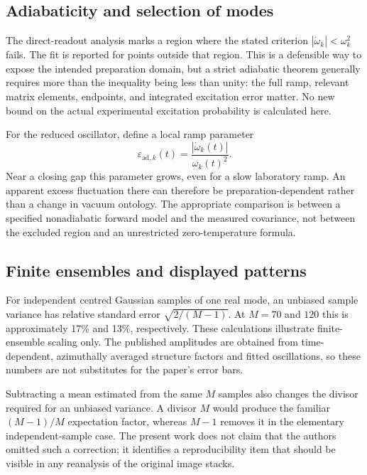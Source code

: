 \documentclass[11pt,a4paper]{article}
\theoremstyle{definition}
\theoremstyle{remark}
\begin{document}
\subsection{Adiabaticity and selection of modes}
The direct-readout analysis marks a region where the stated criterion $|\dot\omega_k|<\omega_k^2$ fails. The fit is reported for points outside that region. This is a defensible way to expose the intended preparation domain, but a strict adiabatic theorem generally requires more than the inequality being less than unity: the full ramp, relevant matrix elements, endpoints, and integrated excitation error matter. No new bound on the actual experimental excitation probability is calculated here.\cite{zhang2026}

For the reduced oscillator, define a local ramp parameter
\begin{equation}
 \varepsilon_{\mathrm{ad},k}(t)
 =\frac{|\dot\omega_k(t)|}{\omega_k(t)^2}.
 \label{eq:adiabatic}
\end{equation}
Near a closing gap this parameter grows, even for a slow laboratory ramp. An apparent excess fluctuation there can therefore be preparation-dependent rather than a change in vacuum ontology. The appropriate comparison is between a specified nonadiabatic forward model and the measured covariance, not between the excluded region and an unrestricted zero-temperature formula.

\subsection{Finite ensembles and displayed patterns}
For independent centred Gaussian samples of one real mode, an unbiased sample variance has relative standard error $\sqrt{2/(M-1)}$. At $M=70$ and $120$ this is approximately 17\% and 13\%, respectively. These calculations illustrate finite-ensemble scaling only. The published amplitudes are obtained from time-dependent, azimuthally averaged structure factors and fitted oscillations, so these numbers are not substitutes for the paper's error bars.\cite{zhang2026}

Subtracting a mean estimated from the same $M$ samples also changes the divisor required for an unbiased variance. A divisor $M$ would produce the familiar $(M-1)/M$ expectation factor, whereas $M-1$ removes it in the elementary independent-sample case. The present work does not claim that the authors omitted such a correction; it identifies a reproducibility item that should be visible in any reanalysis of the original image stacks.
\end{document}
